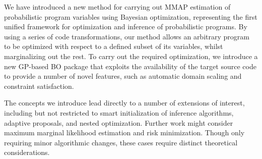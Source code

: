 
We have introduced a new method for carrying out MMAP estimation of probabilistic program variables using Bayesian optimization, representing the first unified framework for optimization and inference of probabilistic programs.  By using a series of code transformations, our method allows an arbitrary program to be optimized with respect to a defined subset of its variables, whilst marginalizing out the rest.  To carry out the required optimization, we introduce a new GP-based BO package that exploits the availability of the target source code to provide a number of novel features, such as automatic domain scaling and constraint satisfaction.  

The concepts we introduce lead directly to a number of extensions of interest, including but not restricted to smart initialization of inference algorithms, adaptive proposals, and nested optimization.  Further work might consider maximum marginal likelihood estimation and risk minimization.  Though only requiring minor algorithmic changes, these cases require distinct theoretical considerations.


